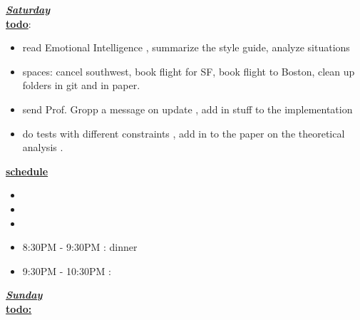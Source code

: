 \underline{\textbf{\textit{Saturday}}}\\
\underline{\textbf{todo}}:
\begin{itemize}
\item read Emotional Intelligence  , summarize the style guide, analyze situations
\item spaces: cancel southwest, book flight for SF, book flight to Boston, clean up folders in git and in paper.
\item send Prof. Gropp a message on update , add in stuff to the implementation
\item do tests with different constraints ,  add in to the paper on the theoretical analysis .

\end{itemize}


\underline{\textbf{schedule}}\\
\begin{itemize}
\item
\item
\item
\item 8:30PM - 9:30PM : dinner
\item 9:30PM - 10:30PM :
\end{itemize}

\underline{\textbf{\textit{Sunday}}}\\
\underline{\textbf{todo:}}\\
\\
\\
\\

